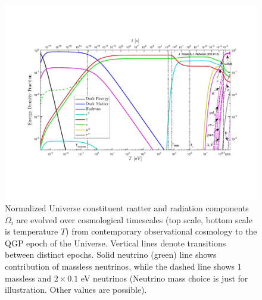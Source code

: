 \documentclass[universe,article,submit,moreauthors,pdftex,a4paper]{Definitions/mdpi}
\begin{document}
\begin{figure}
 \centerline{\includegraphics[trim=70 120 60 100,clip,width=\textwidth,width=\linewidth]{./plots/energy_fractions.pdf}}
 \caption{Normalized  Universe constituent matter and radiation components $\Omega_i$ are evolved over cosmological timescales (top scale, bottom scale is temperature $T$) from contemporary observational cosmology to the QGP epoch of the Universe. Vertical lines denote transitions between distinct epochs. Solid neutrino (green) line shows contribution of massless neutrinos, while the dashed line shows $1$ massless and $2\times 0.1$ eV neutrinos (Neutrino mass choice is just for illustration. Other values are possible). \label{CosmicFraction}}
\end{figure}
\end{document}
